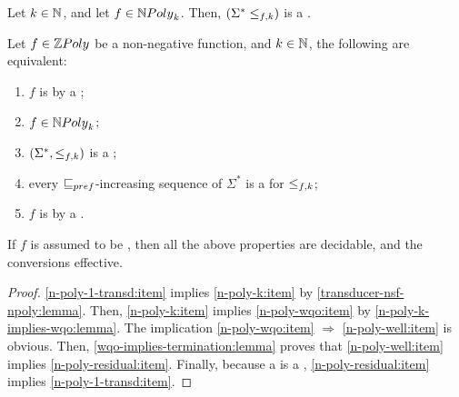 \begin{lemma}
    \label{n-poly-k-implies-wqo:lemma}
    Let $k \in \mathbb{N}$, and let $f \in \NPoly[k]$.
    Then, $(\Sigma^* \mathrel{\leq_{{f},{k}}})$ is a .
\end{lemma}

\begin{theorem}
    \label{non-commutative-npoly:thm}
    Let $f \in \ZPoly$ be a non-negative function, 
    and $k \in \mathbb{N}$,
    the following are equivalent:
    \begin{enumerate}
        \item \label{n-poly-1-transd:item} $f$ is 
            by a ;
        \item \label{n-poly-k:item} $f \in \NPoly[k]$;
        \item \label{n-poly-wqo:item} $(\Sigma^*, \mathrel{\leq_{{f},{k}}})$ is a
            ;
        \item \label{n-poly-well:item} every $\prefleq$-increasing sequence
            of $\Sigma^*$  is a 
            for $\mathrel{\leq_{{f},{k}}}$;
        \item \label{n-poly-residual:item} $f$ is  by a
            .
    \end{enumerate}
    If $f$ is assumed to be , then all the above
    properties are decidable, and the conversions effective.
\end{theorem}
\begin{proof}
    \cref{n-poly-1-transd:item} implies \cref{n-poly-k:item} by
    \cref{transducer-nsf-npoly:lemma}. Then,
    \cref{n-poly-k:item} implies \cref{n-poly-wqo:item} by
    \cref{n-poly-k-implies-wqo:lemma}.
    The implication \cref{n-poly-wqo:item} $\Rightarrow$ \cref{n-poly-well:item}
    is obvious.
    Then, \cref{wqo-implies-termination:lemma} proves
    that \cref{n-poly-well:item} implies \cref{n-poly-residual:item}.
    Finally, because a  is a ,
    \cref{n-poly-residual:item} implies \cref{n-poly-1-transd:item}.
\end{proof}

